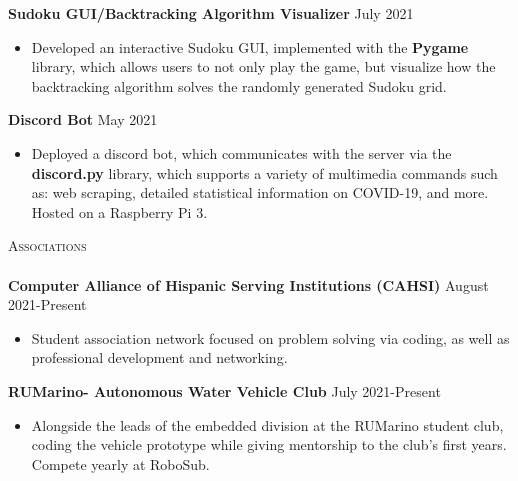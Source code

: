 \documentclass[a4paper]{article}
\newcommand{\lineunder} {
    \vspace*{-8pt} \\
    \hspace*{-18pt} \hrulefill \\
}
\newcommand{\header} [1] {
    {\hspace*{-18pt}\vspace*{6pt} \textsc{#1}}
    \vspace*{-6pt} \lineunder
}
\begin{document}
{\textbf{Sudoku GUI/Backtracking Algorithm Visualizer}} \hfill July 2021  \\
\vspace{-1.5mm}

\begin{itemize} \itemsep -1pt
\item Developed an interactive Sudoku GUI, implemented with the \textbf{Pygame} library, which allows users to not only play the game, but visualize how the backtracking algorithm solves the randomly generated Sudoku grid.
\end{itemize}

\vspace*{-1mm}
{\textbf{Discord Bot}} \hfill May 2021 \\
\vspace{-2.5mm}

\begin{itemize} \itemsep -1pt
\item Deployed a discord bot, which communicates with the server via the \textbf{discord.py} library, which supports a variety of multimedia commands such as: web scraping, detailed statistical information on COVID-19, and more. Hosted on a Raspberry Pi 3.\\
\end{itemize}
\vspace*{1mm}

\header{Associations}

\vspace{-1mm} \textbf{Computer Alliance of Hispanic Serving Institutions (CAHSI)} \hfill August 2021-Present\\
\begin{itemize} \itemsep -1pt
\vspace{-2mm}
\item Student association network focused on problem solving via coding, as well as professional development and networking. \\
\end{itemize}

\vspace{-2mm}
\textbf{RUMarino- Autonomous Water Vehicle Club} \hfill July 2021-Present \\ 
\vspace{-2mm}
\begin{itemize} \itemsep -1pt
\item Alongside the leads of the embedded division at the RUMarino student club, coding the vehicle prototype while giving mentorship to the club's first years. Compete yearly at RoboSub.\\ 
\end{itemize}
 


\ 
\end{document}
